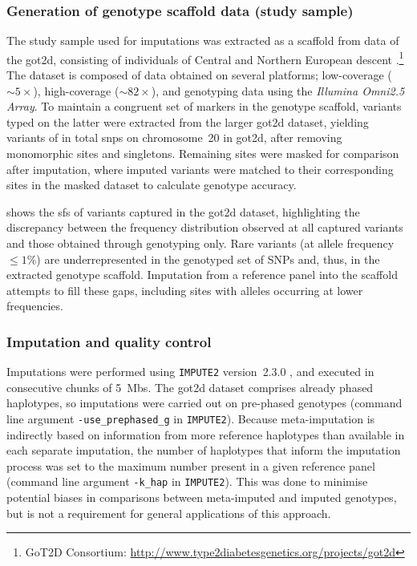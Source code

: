 %
\subsubsection{Generation of genotype scaffold data (study sample)}
%

The study sample used for imputations was extracted as a scaffold from data of the \gls{got2d}, consisting of  individuals of Central and Northern European descent \citep{Fuchsberger:2016df}.\footnote{GoT2D Consortium: \url{http://www.type2diabetesgenetics.org/projects/got2d} }
The dataset is composed of data obtained on several platforms; low-coverage  ($\sim5\times$), high-coverage  ($\sim82\times$), and genotyping data using the \emph{Illumina Omni2.5 Array}.
To maintain a congruent set of markers in the genotype scaffold, variants typed on the latter were extracted from the larger \gls{got2d} dataset, yielding  variants of in total  \glspl{snp} on chromosome~20 in \gls{got2d}, after removing monomorphic sites and singletons.
Remaining sites were masked for comparison after imputation, where imputed variants were matched to their corresponding sites in the masked dataset to calculate genotype accuracy.

%

%

 shows the \gls{sfs} of variants captured in the \gls{got2d} dataset, highlighting the discrepancy between the frequency distribution observed at all captured variants and those obtained through genotyping only.
Rare variants (\eg at allele frequency $\leq1\%$) are underrepresented in the genotyped set of SNPs and, thus, in the extracted genotype scaffold.
Imputation from a reference panel into the scaffold attempts to fill these gaps, including sites with alleles occurring at lower frequencies.


%
\subsubsection{Imputation and quality control}
\label{sec:meta_methods_imp}
%

Imputations were performed using \texttt{IMPUTE2} version~2.3.0 \citep{Howie:2009hq}, and executed in consecutive chunks of 5~\glspl{Mb}.
The \gls{got2d} dataset comprises already phased haplotypes, so imputations were carried out on pre-phased genotypes (command line argument \verb|-use_prephased_g| in \texttt{IMPUTE2}).
Because meta-imputation is indirectly based on information from more reference haplotypes than available in each separate imputation, the number of haplotypes that inform the imputation process was set to the maximum number present in a given reference panel (command line argument \verb|-k_hap| in \texttt{IMPUTE2}).
This was done to minimise potential biases in comparisons between meta-imputed and imputed genotypes, but is not a requirement for general applications of this approach.

